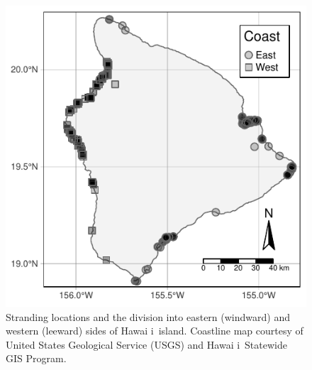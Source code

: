 \documentclass[sn-basic,NameDate]{sn-jnl}\usepackage[]{graphicx}\usepackage[]{xcolor}
\makeatletter
\def\maxwidth{ %
  \ifdim\Gin@nat@width>\linewidth
    \linewidth
  \else
    \Gin@nat@width
  \fi
}
\newenvironment{knitrout}{}{} %
\DeclareRobustCommand{\okina}{%
  \raisebox{\dimexpr\fontcharht\font`A-\height}{%
    \scalebox{0.8}{`}%
  }%
}
\newcommand{\Hawaii}{Hawai\okina i}
\makeatother
\begin{document}
\begin{figure}[tbp]
\centering

\begin{knitrout}
\color{fgcolor}
\includegraphics[width=\maxwidth]{figure/Figure-1} 
\end{knitrout}

\caption{Stranding locations and the division into eastern (windward) and western (leeward) sides of \Hawaii\ island. Coastline map courtesy of United States Geological Service (USGS) and \Hawaii\ Statewide GIS Program.}\label{fig:map}
\end{figure}
\end{document}
